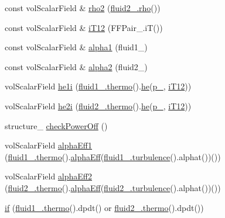 \begin{DoxyCompactItemize}
\item 
const vol\+Scalar\+Field \& \hyperlink{EEqns__2p_8H_ab8b22f18fd142571df90f6dc2c327fbe}{rho2} (\hyperlink{EEqn__1pl_8H_ac955f87ac2b79f02f420cae087fc52b1}{fluid2\+\_\+.\+rho}())
\item 
const vol\+Scalar\+Field \& \hyperlink{EEqns__2p_8H_a826cf3e644cf655af34be4757dec3af1}{i\+T12} (F\+F\+Pair\+\_\+.\+iT())
\item 
const vol\+Scalar\+Field \& \hyperlink{EEqns__2p_8H_ad67e06bee4c61d3ec617e035493b4722}{alpha1} (fluid1\+\_\+)
\item 
const vol\+Scalar\+Field \& \hyperlink{EEqns__2p_8H_abe544d8197b804c4439afde6d860d5d7}{alpha2} (fluid2\+\_\+)
\item 
vol\+Scalar\+Field \hyperlink{EEqns__2p_8H_a39d6325fd5c718554605d5d08c759966}{he1i} (\hyperlink{EEqns__2p_8H_a9d615e711281a88a96c648787c7dbd32}{fluid1\+\_\+.\+thermo}().\hyperlink{EEqn__1pl_8H_aaacc8fea926e2b83e418a1ad3c1e8c43}{he}(\hyperlink{updatePP__rghRho__2p_8H_a0ab83dbbf86dba470a7696e1609d523c}{p\+\_\+}, \hyperlink{EEqns__2p_8H_a826cf3e644cf655af34be4757dec3af1}{i\+T12}))
\item 
vol\+Scalar\+Field \hyperlink{EEqns__2p_8H_a8923e7846abc1ec8e28a1d6c4e37aed5}{he2i} (\hyperlink{EEqns__2p_8H_a9d615e711281a88a96c648787c7dbd32}{fluid2\+\_\+.\+thermo}().\hyperlink{EEqn__1pl_8H_aaacc8fea926e2b83e418a1ad3c1e8c43}{he}(\hyperlink{updatePP__rghRho__2p_8H_a0ab83dbbf86dba470a7696e1609d523c}{p\+\_\+}, \hyperlink{EEqns__2p_8H_a826cf3e644cf655af34be4757dec3af1}{i\+T12}))
\item 
structure\+\_\+ \hyperlink{EEqns__2p_8H_a6f583b62277964112e9cf889f605b698}{check\+Power\+Off} ()
\item 
vol\+Scalar\+Field \hyperlink{EEqns__2p_8H_acb6fe73155cb12ebfe1d45a7781304ea}{alpha\+Eff1} (\hyperlink{EEqns__2p_8H_a9d615e711281a88a96c648787c7dbd32}{fluid1\+\_\+.\+thermo}().\hyperlink{EEqn__1pl_8H_a38742d7dee2b92bbd408c844c42eeab8}{alpha\+Eff}(\hyperlink{UEqns__2p_8H_a1769aacd25eec8e30f213b1c177e12d6}{fluid1\+\_\+.\+turbulence}().alphat())())
\item 
vol\+Scalar\+Field \hyperlink{EEqns__2p_8H_a267118422a918bf7e522eb6585ef474e}{alpha\+Eff2} (\hyperlink{EEqns__2p_8H_a9d615e711281a88a96c648787c7dbd32}{fluid2\+\_\+.\+thermo}().\hyperlink{EEqn__1pl_8H_a38742d7dee2b92bbd408c844c42eeab8}{alpha\+Eff}(\hyperlink{UEqns__2p_8H_a1769aacd25eec8e30f213b1c177e12d6}{fluid2\+\_\+.\+turbulence}().alphat())())
\item 
\hyperlink{EEqns__2p_8H_a645fb38d48c3619a10ad55e9656a5e42}{if} (\hyperlink{EEqns__2p_8H_a9d615e711281a88a96c648787c7dbd32}{fluid1\+\_\+.\+thermo}().dpdt() or \hyperlink{EEqns__2p_8H_a9d615e711281a88a96c648787c7dbd32}{fluid2\+\_\+.\+thermo}().dpdt())

\end{DoxyCompactItemize}
